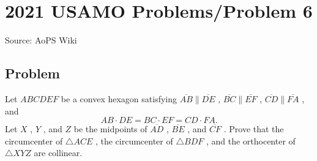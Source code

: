 \documentclass[12pt]{article}
\begin{document}
\section*{{2021 USAMO Problems/Problem 6}}
Source: AoPS Wiki

\subsection*{Problem}
Let $ABCDEF$ be a convex hexagon satisfying $\overline{AB} \parallel \overline{DE}$ , $\overline{BC} \parallel \overline{EF}$ , $\overline{CD} \parallel \overline{FA}$ , and \[AB \cdot DE = BC \cdot EF = CD \cdot FA.\] Let $X$ , $Y$ , and $Z$ be the midpoints of $\overline{AD}$ , $\overline{BE}$ , and $\overline{CF}$ . Prove that the circumcenter of $\triangle ACE$ , the circumcenter of $\triangle BDF$ , and the orthocenter of $\triangle XYZ$ are collinear.
\end{document}
